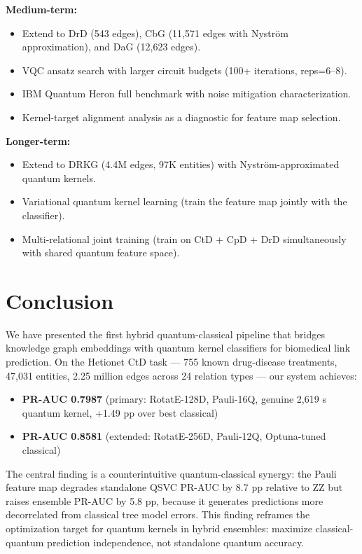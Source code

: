 \documentclass[twocolumn,10pt]{article}
\begin{document}
\textbf{Medium-term:}
\begin{itemize}[leftmargin=*]
\item Extend to DrD (543 edges), CbG (11,571 edges with Nystr\"{o}m approximation), and DaG (12,623 edges).
\item VQC ansatz search with larger circuit budgets (100+ iterations, reps=6--8).
\item IBM Quantum Heron full benchmark with noise mitigation characterization.
\item Kernel-target alignment analysis as a diagnostic for feature map selection.
\end{itemize}

\textbf{Longer-term:}
\begin{itemize}[leftmargin=*]
\item Extend to DRKG (4.4M edges, 97K entities) with Nystr\"{o}m-approximated quantum kernels.
\item Variational quantum kernel learning (train the feature map jointly with the classifier).
\item Multi-relational joint training (train on CtD + CpD + DrD simultaneously with shared quantum feature space).
\end{itemize}

\section{Conclusion}

We have presented the first hybrid quantum-classical pipeline that bridges knowledge graph embeddings with quantum kernel classifiers for biomedical link prediction. On the Hetionet CtD task --- 755 known drug-disease treatments, 47,031 entities, 2.25 million edges across 24 relation types --- our system achieves:

\begin{itemize}[leftmargin=*]
\item \textbf{PR-AUC 0.7987} (primary: RotatE-128D, Pauli-16Q, genuine 2,619 s quantum kernel, +1.49 pp over best classical)
\item \textbf{PR-AUC 0.8581} (extended: RotatE-256D, Pauli-12Q, Optuna-tuned classical)
\end{itemize}

The central finding is a counterintuitive quantum-classical synergy: the Pauli feature map degrades standalone QSVC PR-AUC by 8.7 pp relative to ZZ but raises ensemble PR-AUC by 5.8 pp, because it generates predictions more decorrelated from classical tree model errors. This finding reframes the optimization target for quantum kernels in hybrid ensembles: maximize classical-quantum prediction independence, not standalone quantum accuracy.
\end{document}
